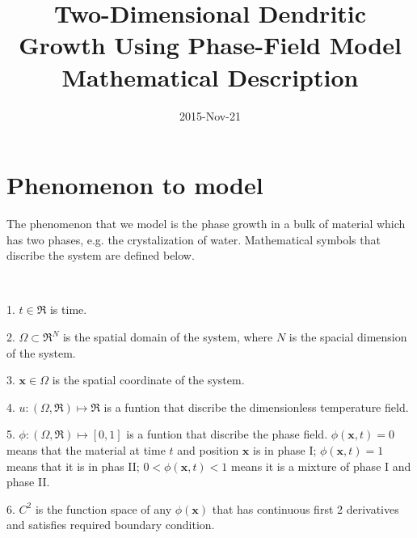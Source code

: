 \documentclass{article}
\title{Two-Dimensional Dendritic Growth Using Phase-Field Model \\ Mathematical Description}
\date{2015-Nov-21}
\author{}
\begin{document}
    \maketitle
    \section{Phenomenon to model}
        The phenomenon that we model is the phase growth in a bulk of material which has two phases, e.g. the crystalization of water. Mathematical symbols that discribe the system are defined below.
        \par \ 
        \par 1. $t\in\Re$ is time.
        \par 2. $\Omega\subset\Re^N$ is the spatial domain of the system, where $N$ is the spacial dimension of the system.
        \par 3. $\bm{x}\in\Omega$ is the spatial coordinate of the system.
        \par 4. $u:(\Omega,\Re)\mapsto\Re$ is a funtion that discribe the dimensionless temperature field.
        \par 5. $\phi:(\Omega,\Re)\mapsto[0,1]$ is a funtion that discribe the phase field. $\phi(\bm{x},t)=0$ means that the material at time $t$ and position $\bm{x}$ is in phase I; $\phi(\bm{x},t)=1$ means that it is in phas II; $0<\phi(\bm{x},t)<1$ means it is a mixture of phase I and phase II.
        \par 6. $C^2$ is the function space of any $\phi(\bm{x})$ that has continuous first 2 derivatives and satisfies required boundary condition.
        
\end{document}
